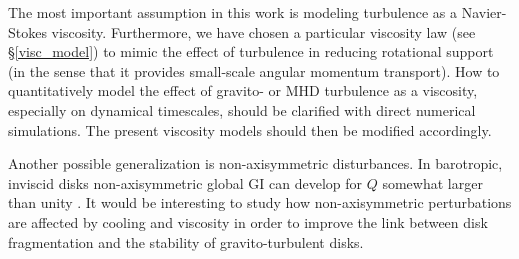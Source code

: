 
The most important assumption in this work is modeling turbulence as a  
Navier-Stokes viscosity. Furthermore, we have chosen a particular  
viscosity law (see \S\ref{visc_model}) to mimic the effect of 
turbulence in reducing rotational support (in the sense that it
provides small-scale angular momentum transport). 
How to quantitatively model the effect of gravito- or MHD turbulence  
as a viscosity, especially on dynamical timescales, should be 
clarified with direct numerical simulations. The present viscosity
models should then be modified accordingly. 

Another possible generalization is non-axisymmetric
disturbances. In barotropic, inviscid disks  
non-axisymmetric global GI can develop for $Q$ somewhat larger than unity
\citep{papaloizou89,adams89,papaloizou91,laughlin97}. It would be interesting to study
how non-axisymmetric perturbations are affected by cooling and
viscosity in order to improve %
the link between disk fragmentation and the
stability of gravito-turbulent disks.   



